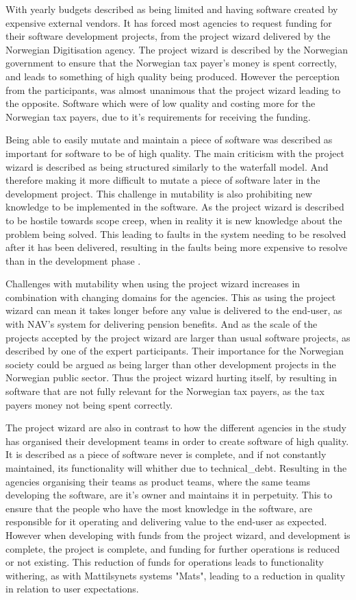 With yearly budgets described as being limited and having software created by expensive external vendors. It has forced most agencies to request funding for their software development projects, from the project wizard delivered by the Norwegian Digitisation agency. The project wizard is described by the Norwegian government to ensure that the Norwegian tax payer's money is spent correctly, and leads to something of high quality being produced. However the perception from the participants, was almost unanimous that the project wizard leading to the opposite. Software which were of low quality and costing more for the Norwegian tax payers, due to it's requirements for receiving the funding.

Being able to easily mutate and maintain a piece of software was described as important for software to be of high quality. The main criticism with the project wizard is described as being structured similarly to the waterfall model. And therefore making it more difficult to mutate a piece of software later in the development project. This challenge in mutability is also prohibiting new knowledge to be implemented in the software. As the project wizard is described to be hostile towards scope creep, when in reality it is new knowledge about the problem being solved. This leading to faults in the system needing to be resolved after it has been delivered, resulting in the faults being more expensive to resolve than in the development phase \cite{sh_2018}\cite{csw_2011}.

 Challenges with mutability when using the project wizard increases in combination with changing domains for the agencies. This as using the project wizard can mean it takes longer before any value is delivered to the end-user, as with NAV's system for delivering pension benefits. And as the scale of the projects accepted by the project wizard are larger than usual software projects, as described by one of the expert participants. Their importance for the Norwegian society could be argued as being larger than other development projects in the Norwegian public sector. Thus the project wizard hurting itself, by resulting in software that are not fully relevant for the Norwegian tax payers, as the tax payers money not being spent correctly.

The project wizard are also in contrast to how the different agencies in the study has organised their development teams in order to create software of high quality. It is described as a piece of software never is complete, and if not constantly maintained, its functionality will whither due to \gls{technical_debt}. Resulting in the agencies organising their teams as product teams, where the same teams developing the software, are it's owner and maintains it in perpetuity. This to ensure that the people who have the most knowledge in the software, are responsible for it operating and delivering value to the end-user as expected. However when developing with funds from the project wizard, and development is complete, the project is complete, and funding for further operations is reduced or not existing. This reduction of funds for operations leads to functionality withering, as with Mattilsynets systems "Mats", leading to a reduction in quality in relation to user expectations.

